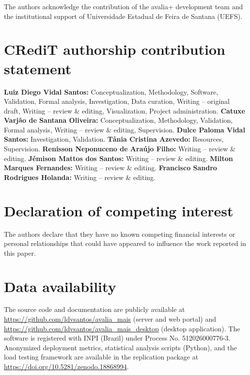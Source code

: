 \documentclass[preprint,12pt,a4paper]{elsarticle}
\begin{document}
The authors acknowledge the contribution of the avalia+ development team and the institutional support of Universidade Estadual de Feira de Santana (UEFS).

\section*{CRediT authorship contribution statement}

\textbf{Luiz Diego Vidal Santos:} Conceptualization, Methodology, Software, Validation, Formal analysis, Investigation, Data curation, Writing -- original draft, Writing -- review \& editing, Visualization, Project administration. \textbf{Catuxe Varjão de Santana Oliveira:} Conceptualization, Methodology, Validation, Formal analysis, Writing -- review \& editing, Supervision. \textbf{Dulce Paloma Vidal Santos:} Investigation, Validation. \textbf{Tânia Cristina Azevedo:} Resources, Supervision. \textbf{Renisson Neponuceno de Araújo Filho:} Writing -- review \& editing. \textbf{Jémison Mattos dos Santos:} Writing -- review \& editing. \textbf{Milton Marques Fernandes:} Writing -- review \& editing. \textbf{Francisco Sandro Rodrigues Holanda:} Writing -- review \& editing.

\section*{Declaration of competing interest}

The authors declare that they have no known competing financial interests or personal relationships that could have appeared to influence the work reported in this paper.

\section*{Data availability}

The source code and documentation are publicly available at \url{https://github.com/ldvsantos/avalia_mais} (server and web portal) and \url{https://github.com/ldvsantos/avalia_mais_desktop} (desktop application). The software is registered with INPI (Brazil) under Process No. 512026000776-3. Anonymized deployment metrics, statistical analysis scripts (Python), and the load testing framework are available in the replication package at \url{https://doi.org/10.5281/zenodo.18868994}.
\end{document}
